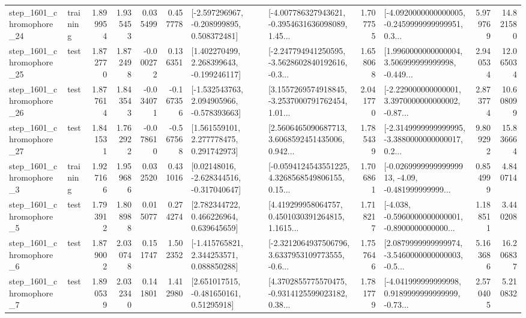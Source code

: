 \begin{tabular}{llrrrrllrlrr}
 step\_1601\_chromophore\_24 &  training &      1.899954 &    1.935453 &      0.035499 &  0.457778 &   [-2.597296967, -0.208999895, 0.508372481] &  [-4.007786327943621, -0.3954631636098089, 1.45... &       1.707755 &  [-4.0920000000000005, -0.2459999999999951, 0.3... &            5.979769 &         14.821580 \\
 step\_1601\_chromophore\_25 &      test &      1.872770 &    1.872498 &     -0.000272 &  0.136351 &    [1.402270499, 2.268399643, -0.199246117] &  [-2.247794941250595, -3.5628602840192616, -0.3... &       1.658068 &  [1.9960000000000004, 3.506999999999998, -0.449... &            2.940534 &         12.065034 \\
 step\_1601\_chromophore\_26 &      test &      1.877614 &    1.843543 &     -0.034071 & -0.167356 &   [-1.532543763, 2.094905966, -0.578393663] &  [3.1557269574918845, -3.2537000791762454, 1.01... &       2.041770 &  [-2.229000000000001, 3.3970000000000002, -0.87... &            2.873774 &         10.608099 \\
 step\_1601\_chromophore\_27 &      test &      1.841531 &    1.762922 &     -0.078610 & -0.567568 &     [1.561559101, 2.277778475, 0.291742973] &  [2.5606465090687713, 3.6068592451435006, 0.942... &       1.785439 &  [-2.3149999999999995, -3.3880000000000017, 0.2... &            9.809292 &         15.836664 \\
  step\_1601\_chromophore\_3 &  training &      1.927166 &    1.959686 &      0.032520 &  0.431016 &    [0.02148016, -2.628344516, -0.317040647] &  [-0.0594124543551225, 4.3268568549806155, 0.15... &       1.706861 &  [-0.026999999999999913, -4.09, -0.481999999999... &            0.854999 &          4.840714 \\
  step\_1601\_chromophore\_5 &      test &      1.793912 &    1.808988 &      0.015077 &  0.274274 &     [2.782344722, 0.466226964, 0.639645659] &  [4.419299958064757, 0.4501030391264815, 1.1615... &       1.718217 &  [-4.038, -0.5960000000000001, -0.8900000000000... &            1.188511 &          3.440208 \\
  step\_1601\_chromophore\_6 &      test &      1.879002 &    2.030748 &      0.151747 &  1.502352 &    [-1.415765821, 2.344253571, 0.088850288] &  [-2.3212064937506796, 3.6337953109773555, -0.6... &       1.757646 &  [2.0879999999999974, -3.5460000000000003, -0.5... &            5.163686 &         16.206837 \\
  step\_1601\_chromophore\_7 &      test &      1.890539 &    2.032340 &      0.141801 &  1.412980 &     [2.651017515, -0.481650161, 0.51295918] &  [4.3702855775570475, -0.9314125599023182, 0.38... &       1.781779 &  [-4.041999999999998, 0.9189999999999999, -0.73... &            2.570405 &          5.210832 \\

\end{tabular}
